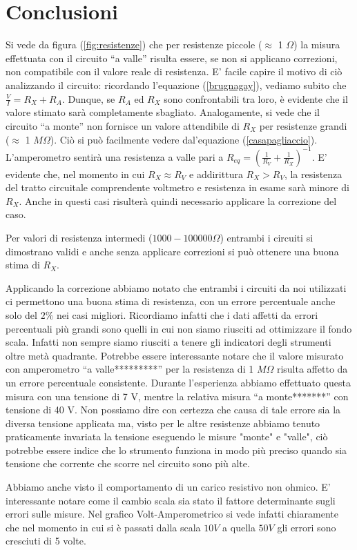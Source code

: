 \section{Conclusioni}
Si vede da figura (\ref{fig:resistenze}) che per resistenze piccole ($\approx$ 1 $\Omega$) la misura effettuata con il circuito ``a valle'' risulta essere, se non si applicano correzioni, non compatibile con il valore reale di resistenza. E' facile capire il motivo di ciò analizzando il circuito: ricordando l'equazione (\ref{brugnagay}), vediamo subito che $\frac{V}{I}=R_X+R_A$. Dunque, se $R_A$ ed $R_X$ sono confrontabili tra loro, è evidente che il valore stimato sarà completamente sbagliato. Analogamente, si vede che il circuito ``a monte'' non fornisce un valore attendibile di $R_X$ per resistenze grandi ($\approx$ 1 $M\Omega$). Ciò si può facilmente vedere dal'equazione (\ref{casapagliaccio}). L'amperometro sentirà una resistenza a valle pari a $R_{eq}=(\frac{1}{R_V}+\frac{1}{R_X})^{-1}$. E' evidente che, nel momento in cui $R_X \approx R_V$ e addirittura $R_X > R_V$, la resistenza del tratto circuitale comprendente voltmetro e resistenza in esame sarà minore di $R_X$. Anche in questi casi risulterà quindi necessario applicare la correzione del caso. 

Per valori di resistenza intermedi ($1000-100000 \Omega$) entrambi i circuiti si dimostrano validi e anche senza applicare correzioni si può ottenere una buona stima di $R_X$.

Applicando la correzione abbiamo notato che entrambi i circuiti da noi utilizzati ci permettono una buona stima di resistenza, con un errore percentuale anche solo del $2\%$ nei casi migliori. Ricordiamo infatti che i dati affetti da errori percentuali più grandi sono quelli in cui non siamo riusciti ad ottimizzare il fondo scala. Infatti non sempre siamo riusciti a tenere gli indicatori degli strumenti oltre metà quadrante. Potrebbe essere interessante notare che il valore misurato con amperometro ``a valle*********'' per la resistenza di 1 $M \Omega$ risulta affetto da un errore percentuale consistente. Durante l'esperienza abbiamo effettuato questa misura con una tensione di 7 V, mentre la relativa misura ``a monte*******'' con tensione di 40 V. Non possiamo dire con certezza che causa di tale errore sia la diversa tensione applicata ma, visto per le altre resistenze abbiamo tenuto praticamente invariata la tensione eseguendo le misure "monte" e "valle", ciò potrebbe essere indice che lo strumento funziona in modo più preciso quando sia tensione che corrente che scorre nel circuito sono più alte. 


 Abbiamo anche visto il comportamento di un carico resistivo non ohmico. E' interessante notare come il cambio scala sia stato il fattore determinante sugli errori sulle misure. Nel grafico Volt-Amperometrico si vede infatti chiaramente che nel momento in cui si è passati dalla scala $10V$ a quella $50V$ gli errori sono cresciuti di 5 volte.